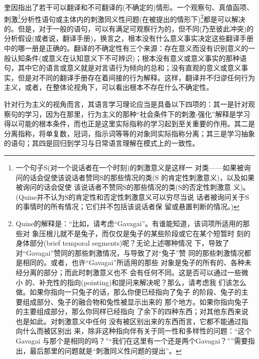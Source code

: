 \documentclass{article}
\begin{document}
奎因指出了若干可以翻译和不可翻译的(不确定的)情形。一个观察句、真值函项、刺激\footnote{一个句子S(对一个说话者在一个时刻)的刺激意义是这样一 对类——如果被询问的话会促使该说话者赞同S的那些情况的类(S 的肯定性刺激意义)，以及如果被询问的话会促使 该说话者不赞同S的那些情况的类(S的否定性刺激意 义)。(Quine并不认为S的肯定性和否定性刺激意义可以穷尽当说 话者被询问关于S的事情时的所有情况；它们并不包括该说话者保 留或悬置判断的情况。)}分析性语句或主体内的刺激同义性问题(在被提出的情形下)\footnote{Quine的解释是：“比如，请考虑“Gavagai”。有谁能知道，该词项所适用的那些对 象压根儿就不是兔子，而仅仅是兔子的某些阶段或它在某个短暂时 刻的身体部分(brief temporal segments)呢？无论上述哪种情况 下，导致了对“Gavagai”赞同的那些刺激情况，与导致了对“兔子”赞 同的那些刺激情况都是相同的。或者，也许“Gavagai”所适用的那些 对象是兔子的所有的、各种未经分离的部分；而此时刺激意义也不 会有任何不同。这是否可以通过一些微小 的、补充性的指向(pointing)和提问来解决呢？那么，请考虑我 们该怎么做。如果你指向一只兔子的话，那么你便已经指向了兔子 的阶段、兔子的主要组成部分、兔子的融合物和兔性被显示出来的 那个地方。如果你指向兔子的主要组成部分，那么你同样已经指向 了余下的四种东西；对其他东西来说也是如此。对刺激意义中任何 没有被区别出来的东西而言，它都不能通过指向什么而被区别出 来，除非这种指向伴有关于同一性和多样性的问题：“这个Gavagai 与那个是相同的吗？”“我们在这里有一个还是两个Gavagai？””需要指出，最后那里的问题就是“刺激同义性问题的提出”。}都是可以解决的。但是，对于一般的语句，可以有满足可观察行为的，但不同(乃至彼此冲突)的分析假设(或者说，翻译手册)，换言之，根本没有什么意义事实决定这些翻译手册中的哪一册是正确的。翻译的不确定性有三个来源：存在意义而没有识别意义的一般认知条件(或意义在认知意义下不可辨识)；根本没有意义或意义事实的那种语句，其中它的语言或意义就是对言语行为倾向的总和；没有直观的意义或意义事实，但是对不同的翻译手册存在着间接的行为解释。这样，翻译并不归谬任何行为主义，或者，在整体论视角下，可以看出根本不存在什么不确定性。

针对行为主义的视角而言，其语言学习理论应当是具备以下四项的：其一是针对观察句的学习，因为在那里，行为主义的那种“社会条件下的刺激-强化”解释是学习得以可能的根本条件，而也正是这里实际指称的学习起到至关重要的作用。其二是分离指称，将单复数，冠词，指示词等等的对象同实际指称分离；其三是学习抽象的语句；其四是回归到学习与日常语言理解在模式上的一致性。
\end{document}
